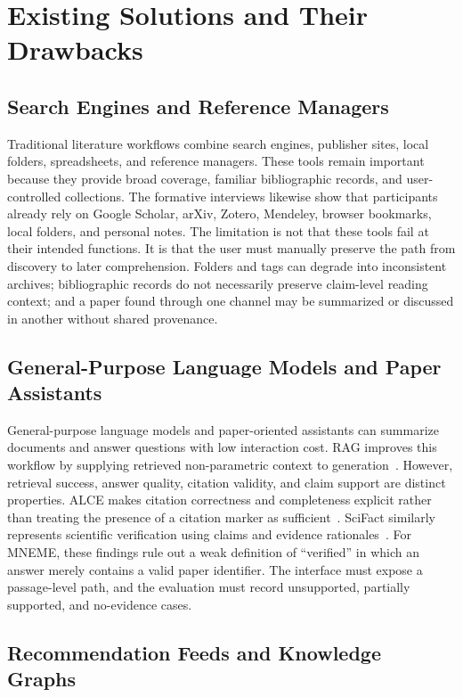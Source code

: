 \section{Existing Solutions and Their Drawbacks}

\subsection{Search Engines and Reference Managers}

Traditional literature workflows combine search engines, publisher sites, local folders, spreadsheets, and reference managers.
These tools remain important because they provide broad coverage, familiar bibliographic records, and user-controlled collections.
The formative interviews likewise show that participants already rely on Google Scholar, arXiv, Zotero, Mendeley, browser bookmarks, local folders, and personal notes.
The limitation is not that these tools fail at their intended functions.
It is that the user must manually preserve the path from discovery to later comprehension.
Folders and tags can degrade into inconsistent archives; bibliographic records do not necessarily preserve claim-level reading context; and a paper found through one channel may be summarized or discussed in another without shared provenance.

\subsection{General-Purpose Language Models and Paper Assistants}

General-purpose language models and paper-oriented assistants can summarize documents and answer questions with low interaction cost.
RAG improves this workflow by supplying retrieved non-parametric context to generation~\cite{lewis2020rag}.
However, retrieval success, answer quality, citation validity, and claim support are distinct properties.
ALCE makes citation correctness and completeness explicit rather than treating the presence of a citation marker as sufficient~\cite{gao2023alce}.
SciFact similarly represents scientific verification using claims and evidence rationales~\cite{wadden2020scifact}.
For MNEME, these findings rule out a weak definition of ``verified'' in which an answer merely contains a valid paper identifier.
The interface must expose a passage-level path, and the evaluation must record unsupported, partially supported, and no-evidence cases.

\subsection{Recommendation Feeds and Knowledge Graphs}

